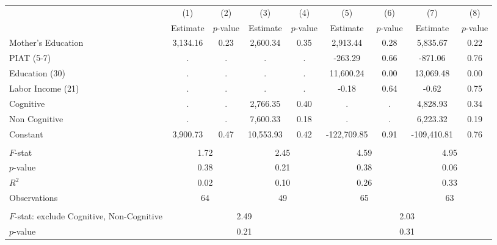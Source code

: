 \begin{tabular}{lcccccccc} \toprule
 & (1) & (2) & (3) & (4) & (5) & (6) & (7) & (8) \\
 & Estimate & $p$-value & Estimate & $p$-value  & Estimate & $p$-value  & Estimate & $p$-value  \\ \midrule 
Mother's Education &     3,134.16 &         0.23 &     2,600.34 &         0.35 &     2,913.44 &         0.28 &     5,835.67 &         0.22 \\  
PIAT (5-7) &            . &            . &            . &            . &      -263.29 &         0.66 &      -871.06 &         0.76 \\  
Education (30) &            . &            . &            . &            . &    11,600.24 &         0.00 &    13,069.48 &         0.00 \\  
Labor Income (21) &            . &            . &            . &            . &        -0.18 &         0.64 &        -0.62 &         0.75 \\  
Cognitive &            . &            . &     2,766.35 &         0.40 &            . &            . &     4,828.93 &         0.34 \\  
Non Cognitive &            . &            . &     7,600.33 &         0.18 &            . &            . &     6,223.32 &         0.19 \\  
Constant &     3,900.73 &         0.47 &    10,553.93 &         0.42 &  -122,709.85 &         0.91 &  -109,410.81 &         0.76 \\  \\ \midrule
$F$-stat &         \multicolumn{2}{c}{1.72} &          \multicolumn{2}{c}{2.45} &          \multicolumn{2}{c}{4.59} &             \multicolumn{2}{c}{4.95} \\ 
$p$-value &         \multicolumn{2}{c}{0.38} &          \multicolumn{2}{c}{0.21} &          \multicolumn{2}{c}{0.38} &             \multicolumn{2}{c}{0.06} \\ 
$R^2$ &         \multicolumn{2}{c}{0.02} &          \multicolumn{2}{c}{0.10} &          \multicolumn{2}{c}{0.26} &             \multicolumn{2}{c}{0.33} \\ 
Observations &         \multicolumn{2}{c}{64} &         \multicolumn{2}{c}{49} &                \multicolumn{2}{c}{65} &       \multicolumn{2}{c}{63}  \\   \\ \midrule
$F$-stat: exclude Cognitive, Non-Cognitive &             \multicolumn{4}{c}{2.49} &              \multicolumn{4}{c}{2.03}  \\  
$p$-value &                 \multicolumn{4}{c}{0.21} &                   \multicolumn{4}{c}{0.31}  \\    \bottomrule \end{tabular}

